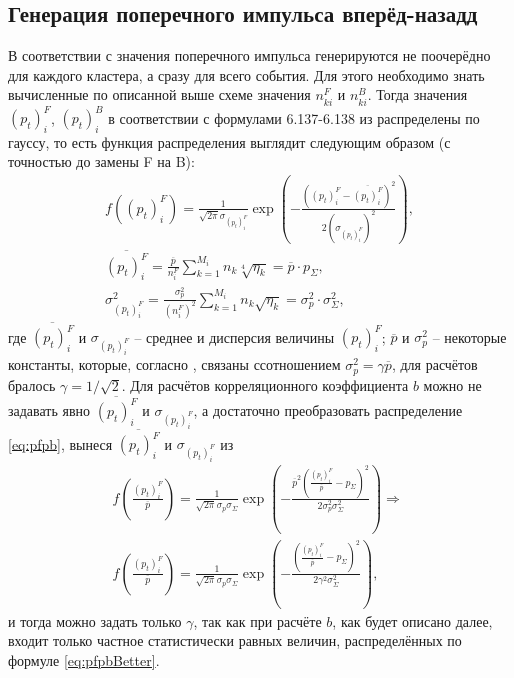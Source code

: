 \subsection{Генерация поперечного импульса вперёд-назадд}
В соответствии с \cite{dissert} значения поперечного импульса генерируются не поочерёдно для каждого кластера, а сразу для всего события. Для этого необходимо знать вычисленные по описанной выше схеме значения $n^F_{ki}$ и $n^B_{ki}$. Тогда значения $(p_t)_i^F$, $(p_t)_i^B$ в соответствии с формулами 6.137-6.138 из \cite{dissert} распределены по гауссу, то есть функция распределения выглядит следующим образом (с точностью до замены F на B):
\begin{equation} \label{eq:pfpb}
\begin{split}
	f((p_t)_i^F) = \frac{1}{\sqrt{2\pi} \sigma_{(p_t)_i^F}} \exp{\left( - \frac{((p_t)_i^F - \overline{(p_t)_i^F})^2}{2(\sigma_{(p_t)_i^F})^2} \right)}, \\
	\overline{(p_t)_i^F} = \frac{\overline{p}}{n_i^F} \sum_{k = 1}^{M_i} n_k \sqrt[4]{\eta_k} = \overline{p} \cdot p_\Sigma, \qquad \quad \quad \\
	\sigma_{(p_t)_i^F}^2 = \frac{\sigma_p^2}{(n_i^F)^2} \sum_{k = 1}^{M_i} n_k \sqrt{\eta_k} = \sigma_p^2 \cdot \sigma_\Sigma^2, \quad \quad \quad
\end{split}
\end{equation}
где $\overline{(p_t)_i^F}$ и $\sigma_{(p_t)_i^F}$ -- среднее и дисперсия величины $(p_t)_i^F$; $\overline{p}$ и $\sigma_p^2$ -- некоторые константы, которые, согласно \cite{dissert}, связаны ссотношением $\sigma_p^2 = \gamma \overline{p}$, для расчётов бралось $\gamma = 1/\sqrt{2}$. Для расчётов корреляционного коэффициента $b$ можно не задавать явно $\overline{(p_t)_i^F}$ и $\sigma_{(p_t)_i^F}$, а достаточно преобразовать распределение \ref{eq:pfpb}, вынеся $\overline{(p_t)_i^F}$ и $\sigma_{(p_t)_i^F}$ из 
\begin{equation} \label{eq:pfpbBetter}
\begin{split}
	f \left( \frac{ (p_t)_i^F } { \overline{p} } \right) = \frac{1}{\sqrt{2 \pi} \sigma_p \sigma_\Sigma} \exp{ \left( - \frac{ \overline{p}^2 \left( \frac{ (p_t)_i^F }{ \overline{p} } - p_\Sigma \right)^2} { 2 \sigma_p^2 \sigma_\Sigma^2 } \right) } \Longrightarrow \\
	f \left( \frac{ (p_t)_i^F } { \overline{p} } \right) = \frac{1}{\sqrt{2 \pi} \sigma_p \sigma_\Sigma} \exp{ \left( - \frac{ \left( \frac{ (p_t)_i^F }{ \overline{p} } - p_\Sigma \right)^2} { 2 \gamma^2 \sigma_\Sigma^2 } \right) }, \quad \enspace \enspace
\end{split}
\end{equation}
и тогда можно задать только $\gamma$, так как при расчёте $b$, как будет описано далее, входит только частное статистически равных величин, распределённых по формуле \ref{eq:pfpbBetter}.
